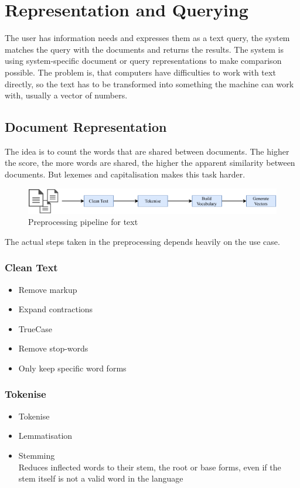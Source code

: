 \documentclass[11pt]{article}
\begin{document}
\section{Representation and Querying}
The user has information needs and expresses them as a text query, the system matches the query with the documents and returns the results.
The system is using system-specific document or query representations to make comparison possible. The problem is, that computers have difficulties to work with text directly, so the text has to be transformed into something the machine can work with, usually a vector of numbers.

\subsection{Document Representation}
The idea is to count the words that are shared between documents. The higher the score, the more words are shared, the higher the apparent similarity between documents. But lexemes and capitalisation makes this task harder.
\begin{figure}[H]
	\centering
	\includegraphics[width=0.8\linewidth]{img/preprocessing_pipeline}
	\caption{Preprocessing pipeline for text}
	\label{fig:preprocessingpipeline}
\end{figure}
The actual steps taken in the preprocessing depends heavily on the use case.

\subsubsection{Clean Text}
\begin{itemize}[noitemsep]
	\item Remove markup
	\item Expand contractions
	\item TrueCase
	\item Remove stop-words
	\item Only keep specific word forms
\end{itemize}

\subsubsection{Tokenise}
\begin{itemize}[noitemsep]
	\item Tokenise
	\item Lemmatisation
	\item Stemming\\
	Reduces inflected words to their stem, the root or base forms, even if the stem itself is not a valid word in the language
\end{itemize}
\end{document}
